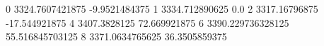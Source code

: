 0 3324.7607421875 -9.9521484375
1 3334.712890625 0.0
2 3317.16796875 -17.544921875
4 3407.3828125 72.669921875
6 3390.229736328125 55.516845703125
8 3371.0634765625 36.3505859375
